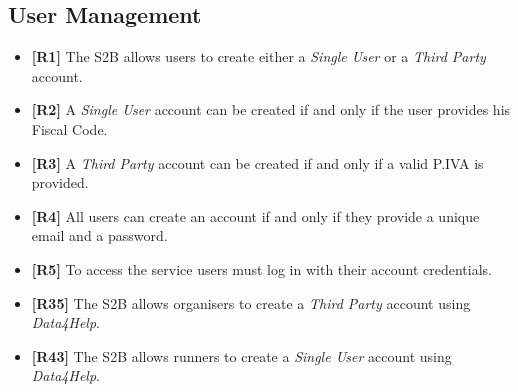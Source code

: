 \documentclass[titlepage]{article}
\begin{document}
	
	\subsection{User Management}
	\begin{itemize}
		\item {\bf [R1]} The S2B allows users to create either a {\it Single User} or a {\it Third Party} account. 
		\item {\bf [R2]} A {\it Single User} account can be created if and only if the user provides his Fiscal Code. 
		\item {\bf [R3]} A {\it Third Party} account can be created if and only if a valid P.IVA is provided. 
		\item {\bf [R4]} All users can create an account if and only if they provide a unique email and a password. 
		\item {\bf [R5]} To access the service users must log in with their account credentials.
		\item {\bf [R35]} The S2B allows organisers to create a {\it Third Party} account using {\it Data4Help}.
		\item {\bf [R43]} The S2B allows runners to create a {\it Single User} account using {\it Data4Help}.
	\end{itemize}			
	
\end{document}
